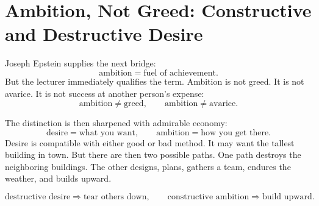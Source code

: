 \section{Ambition, Not Greed: Constructive and Destructive Desire}

Joseph Epstein supplies the next bridge:
\begin{equation}
\text{ambition}=\text{fuel of achievement}.
\end{equation}
But the lecturer immediately qualifies the term. Ambition is not greed. It is not avarice. It is not success at another person's expense:
\begin{equation}
\text{ambition}\neq \text{greed},
\qquad
\text{ambition}\neq \text{avarice}.
\end{equation}

The distinction is then sharpened with admirable economy:
\begin{equation}
\text{desire}=\text{what you want},
\qquad
\text{ambition}=\text{how you get there}.
\end{equation}
Desire is compatible with either good or bad method. It may want the tallest building in town. But there are then two possible paths. One path destroys the neighboring buildings. The other designs, plans, gathers a team, endures the weather, and builds upward.

\begin{equation}
\text{destructive desire}\Rightarrow \text{tear others down},
\qquad
\text{constructive ambition}\Rightarrow \text{build upward}.
\end{equation}

\begin{figure}
\centering
{}
\end{figure}

